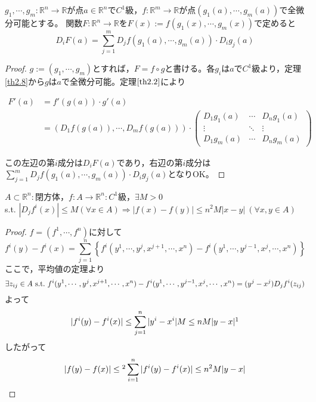 \begin{framed}
	\begin{thm}\label{th2.9}
		$g_1,\cdots,g_m:\mathbb{R}^n\to\mathbb{R}$が点$a\in\mathbb{R}^n$で$C^1$級，$f:\mathbb{R}^m\to\mathbb{R}$が点$(g_1(a),\cdots,g_m(a))$で全微分可能とする。
		関数$F:\mathbb{R}^n\to\mathbb{R}$を$F(x):=f(g_1(x),\cdots,g_m(x))$で定めると
		\[
		D_iF(a)=\sum_{j=1}^mD_jf(g_1(a),\cdots,g_m(a))\cdot D_ig_j(a)
		\]
	\end{thm}
\end{framed}

\begin{proof}
	$g:=(g_1,\cdots,g_m)$とすれば，$F=f\circ g$と書ける。各$g_i$は$a$で$C^1$級より，定理\ref{th2.8}から$g$は$a$で全微分可能。定理$\ref{th2.2}$により

	\[
	\begin{split}
	F'(a)&=f'(g(a))\cdot g'(a)\\
	&=(D_1f(g(a)),\cdots,D_mf(g(a)))\cdot
	\begin{pmatrix}
		D_1g_1(a) & \cdots & D_ng_1(a)\\
		\vdots & \ddots & \vdots \\
		D_1g_m(a) & \cdots & D_ng_m(a)
	\end{pmatrix}
	\end{split}
	\]

この左辺の第$i$成分は$D_iF(a)$であり，右辺の第$i$成分は$\displaystyle\sum_{j=1}^m D_jf(g_1(a),\cdots,g_m(a))\cdot D_ig_j(a)$となりOK。
\end{proof}

\begin{framed}
	\begin{lem}\label{lem2.10}
		$A\subset\mathbb{R}^n:$閉方体，$f:A\to\mathbb{R}^n:C^1$級，$\exists M>0$\\ s.t. $|D_jf^i(x)|\leq M(\forall x\in A) \Rightarrow |f(x)-f(y)|\leq n^2 M|x-y|\ (\forall x,y\in A)$
	\end{lem}
\end{framed}
\begin{proof}
	$f=(f^1,\cdots,f^n)$に対して
	\[
	f^i(y)-f^i(x)=\sum_{j=1}^n\left\{f^i(y^1,\cdots,y^j,x^{j+1},\cdots,x^n)-f^i(y^1,\cdots,y^{j-1},x^j,\cdots,x^n)\right\}
	\]
	ここで，平均値の定理より
	\[
	\exists z_{ij}\in A\ {\rm s.t.}\ f^i(y^1,\cdots,y^j,x^{j+1},\cdots,x^n)-f^i(y^1,\cdots,y^{j-1},x^j,\cdots,x^n)=(y^j-x^j)D_jf^i(z_{ij})
	\]
	よって
	\[
	|f^i(y)-f^i(x)|\leq\sum_{j=1}^n|y^i-x^i|M\leq nM|y-x|\footnotemark
	\]
	したがって
	\[
	|f(y)-f(x)|\leq\footnotemark\sum_{i=1}^n|f^i(y)-f^i(x)|\leq n^2M|y-x|
	\]
\end{proof}

